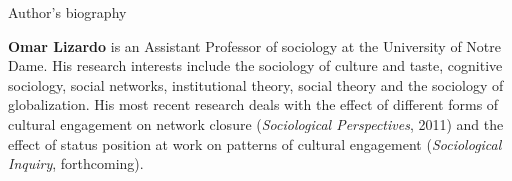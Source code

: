 \newpage
\begin{center}
	{\large Author's biography}
\end{center}

{\bf Omar Lizardo} is an Assistant Professor of sociology at the University of Notre Dame.  His research interests include the sociology of culture and taste, cognitive sociology, social networks, institutional theory, social theory and the sociology of globalization.  His most recent research deals with the effect of different forms of cultural engagement on network closure (\emph{Sociological Perspectives}, 2011) and the effect of status position at work on patterns of cultural engagement (\emph{Sociological Inquiry}, forthcoming).  